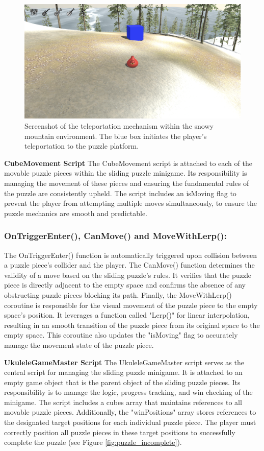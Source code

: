 \documentclass{l4proj}
\begin{document}
\begin{figure}[h]
  \centering
  \includegraphics[width=0.7\linewidth]{dissertation/images/Sliding_Teleport.png} 
  \caption{Screenshot of the teleportation mechanism within the snowy mountain environment. The blue box initiates the player's teleportation to the puzzle platform.} 
  \label{fig:teleportation} 
\end{figure}

\textbf{CubeMovement Script} \newline
The CubeMovement script is attached to each of the movable puzzle pieces within the sliding puzzle minigame. Its responsibility is managing the movement of these pieces and ensuring the fundamental rules of the puzzle are consistently upheld. The script includes an isMoving flag to prevent the player from attempting multiple moves simultaneously, to ensure the puzzle mechanics are smooth and predictable.

\subsubsection{OnTriggerEnter(), CanMove() and MoveWithLerp():} The OnTriggerEnter() function is automatically triggered upon collision between a puzzle piece's collider and the player. The CanMove() function determines the validity of a move based on the sliding puzzle's rules. It verifies that the puzzle piece is directly adjacent to the empty space and confirms the absence of any obstructing puzzle pieces blocking its path. Finally, the MoveWithLerp() coroutine is responsible for the visual movement of the puzzle piece to the empty space's position. It leverages a function called "Lerp()" for linear interpolation, resulting in an smooth transition of the puzzle piece from its original space to the empty space. This coroutine also updates the "isMoving" flag to accurately manage the movement state of the puzzle piece.\newline

\textbf{UkuleleGameMaster Script} \newline
The UkuleleGameMaster script serves as the central script for managing the sliding puzzle minigame. It is attached to an empty game object that is the parent object of the sliding puzzle pieces. Its responsibility is to manage the logic, progress tracking, and win checking of the minigame. The script includes a cubes array that maintains references to all movable puzzle pieces. Additionally, the "winPositions" array stores references to the designated target positions for each individual puzzle piece. The player must correctly position all puzzle pieces in these target positions to successfully complete the puzzle (see Figure \ref{fig:puzzle_incomplete}).
\end{document}
